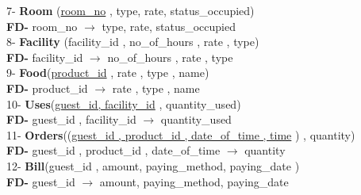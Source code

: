 \documentclass[a4,12pt]{report}
\begin{document}
7-	\textbf{Room} (\uline{room\_no} , type, rate, status\_occupied) \\
\textbf{FD-} room\_no $ \rightarrow $  type, rate, status\_occupied \\

8- \textbf{Facility} (facility\_id , no\_of\_hours , rate , type) \\
\textbf{FD-} facility\_id $ \rightarrow $ no\_of\_hours , rate , type \\

9- \textbf{Food}(\uline{product\_id} , rate , type , name) \\
\textbf{FD- } product\_id $ \rightarrow $ rate , type , name \\

10- \textbf{Uses}(\uline{guest\_id, facility\_id} , quantity\_used) \\
\textbf{FD-} guest\_id , facility\_id $ \rightarrow $ quantity\_used \\

11- \textbf{Orders}((\uline{guest\_id , product\_id , date\_of\_time , time}  ) , quantity) \\
\textbf{FD-} guest\_id , product\_id , date\_of\_time $ \rightarrow $ quantity \\

12- \textbf{Bill}(guest\_id , amount, paying\_method, paying\_date ) \\
\textbf{FD-} guest\_id $ \rightarrow $ amount, paying\_method, paying\_date \\
\end{document}
